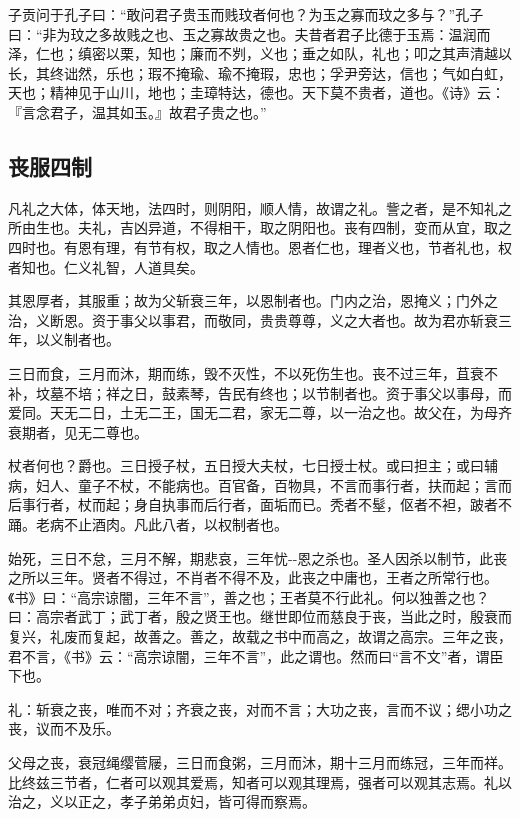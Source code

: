 \documentclass[]{article}
\begin{document}
子贡问于孔子曰：``敢问君子贵玉而贱玟者何也？为玉之寡而玟之多与？''孔子曰：``非为玟之多故贱之也、玉之寡故贵之也。夫昔者君子比德于玉焉：温润而泽，仁也；缜密以栗，知也；廉而不刿，义也；垂之如队，礼也；叩之其声清越以长，其终诎然，乐也；瑕不掩瑜、瑜不掩瑕，忠也；孚尹旁达，信也；气如白虹，天也；精神见于山川，地也；圭璋特达，德也。天下莫不贵者，道也。《诗》云：『言念君子，温其如玉。』故君子贵之也。''

\hypertarget{header-n966}{%
\subsection{丧服四制}\label{header-n966}}

凡礼之大体，体天地，法四时，则阴阳，顺人情，故谓之礼。訾之者，是不知礼之所由生也。夫礼，吉凶异道，不得相干，取之阴阳也。丧有四制，变而从宜，取之四时也。有恩有理，有节有权，取之人情也。恩者仁也，理者义也，节者礼也，权者知也。仁义礼智，人道具矣。

其恩厚者，其服重；故为父斩衰三年，以恩制者也。门内之治，恩掩义；门外之治，义断恩。资于事父以事君，而敬同，贵贵尊尊，义之大者也。故为君亦斩衰三年，以义制者也。

三日而食，三月而沐，期而练，毁不灭性，不以死伤生也。丧不过三年，苴衰不补，坟墓不培；祥之日，鼓素琴，告民有终也；以节制者也。资于事父以事母，而爱同。天无二日，土无二王，国无二君，家无二尊，以一治之也。故父在，为母齐衰期者，见无二尊也。

杖者何也？爵也。三日授子杖，五日授大夫杖，七日授士杖。或曰担主；或曰辅病，妇人、童子不杖，不能病也。百官备，百物具，不言而事行者，扶而起；言而后事行者，杖而起；身自执事而后行者，面垢而已。秃者不髽，伛者不袒，跛者不踊。老病不止酒肉。凡此八者，以权制者也。

始死，三日不怠，三月不解，期悲哀，三年忧-\/-恩之杀也。圣人因杀以制节，此丧之所以三年。贤者不得过，不肖者不得不及，此丧之中庸也，王者之所常行也。《书》曰：``高宗谅闇，三年不言''，善之也；王者莫不行此礼。何以独善之也？曰：高宗者武丁；武丁者，殷之贤王也。继世即位而慈良于丧，当此之时，殷衰而复兴，礼废而复起，故善之。善之，故载之书中而高之，故谓之高宗。三年之丧，君不言，《书》云：``高宗谅闇，三年不言''，此之谓也。然而曰``言不文''者，谓臣下也。

礼：斩衰之丧，唯而不对；齐衰之丧，对而不言；大功之丧，言而不议；缌小功之丧，议而不及乐。

父母之丧，衰冠绳缨菅屦，三日而食粥，三月而沐，期十三月而练冠，三年而祥。比终兹三节者，仁者可以观其爱焉，知者可以观其理焉，强者可以观其志焉。礼以治之，义以正之，孝子弟弟贞妇，皆可得而察焉。
\end{document}
